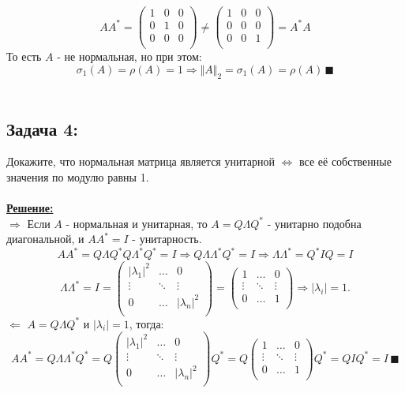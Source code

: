 \documentclass[a4paper,12pt,titlepage,final]{article}
\begin{document}
\begin{enumerate}
$$ 
AA^* = \left(\begin{smallmatrix} 
    1 & 0 & 0 \\
    0 & 1 & 0 \\
    0 & 0 & 0 \\
\end{smallmatrix} \right) \neq
\left(\begin{smallmatrix} 
    1 & 0 & 0 \\
    0 & 0 & 0 \\
    0 & 0 & 1 \\
\end{smallmatrix} \right) = A^*A
$$
То есть $A$ - не нормальная, но при этом: 
$$ \sigma_1(A) = \rho(A) = 1 \Rightarrow \Vert A \Vert_2 = \sigma_1(A) = \rho(A) \, \blacksquare$$ \\
\end{enumerate}


\subsection*{Задача 4:}
\noindent Докажите, что нормальная матрица является унитарной $\Leftrightarrow$ все её собственные значения по модулю равны 1.\\ \\
\textbf{\underline{Решение:}} \\
$\boldsymbol{\Rightarrow}$ Если $A$ - нормальная и унитарная, то $A = Q\Lambda Q^*$ - унитарно подобна диагональной, и $AA^* = I$ - унитарность. 
$$ AA^* =  Q\Lambda Q^* Q \Lambda^* Q^* = I \Rightarrow Q \Lambda \Lambda^* Q^* = I \Rightarrow \Lambda \Lambda^* = Q^*IQ = I $$
$$ \Lambda \Lambda^* = I =
\begin{pmatrix}
    |\lambda_1|^2 & \ldots & 0 \\
    \vdots & \ddots & \vdots \\
    0 & \ldots & |\lambda_n|^2 \\
\end{pmatrix} = 
\begin{pmatrix}
    1 & \ldots & 0 \\
    \vdots & \ddots & \vdots \\
    0 & \ldots & 1 \\
\end{pmatrix} \Rightarrow |\lambda_i| = 1. $$
$\boldsymbol{\Leftarrow}$ $A = Q\Lambda Q^*$ и $|\lambda_i| = 1$, тогда:
$$ AA^* = Q\Lambda\Lambda^*Q^* = Q
\begin{pmatrix}
    |\lambda_1|^2 & \ldots & 0 \\
    \vdots & \ddots & \vdots \\
    0 & \ldots & |\lambda_n|^2 \\
\end{pmatrix} Q^* = Q
\begin{pmatrix}
    1 & \ldots & 0 \\
    \vdots & \ddots & \vdots \\
    0 & \ldots & 1 \\
\end{pmatrix} Q^* = QIQ^* = I \, \blacksquare $$ \\
\end{document}
